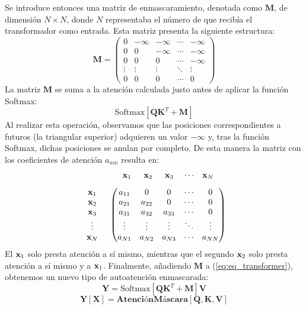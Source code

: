 Se introduce entonces una matriz de enmascaramiento, denotada como $\mathbf{M}$, 
de dimensión $N \times N$, donde $ N$ representaba el número de \tokens{} que 
recibía el transformador como entrada. Esta matriz presenta la siguiente 
estructura:
\begin{equation*}
    \mathbf{M} = \begin{pmatrix} 
0 & -\infty & -\infty & \cdots & -\infty \\ 
0 & 0 & -\infty & \cdots & -\infty \\ 
0 & 0 & 0 & \cdots & -\infty \\
\vdots & \vdots & \vdots & \ddots & \vdots \\ 
0 & 0 & 0 & \cdots & 0 
\end{pmatrix}
\end{equation*}
La matriz $\mathbf{M}$ se suma a la atención calculada justo antes de aplicar la función Softmax:
$$\text{Softmax}\left[ \mathbf{Q} \mathbf{K}^T + \mathbf{M} \right]$$
Al realizar esta operación, observamos que las posiciones correspondientes a \tokens{} futuros (la triangular superior) adquieren un valor $-\infty$ y, tras la función Softmax, dichas posiciones se anulan por completo. De esta manera la matriz con los coeficientes de atención $a_{nm}$ resulta en:
\[
\begin{array}{cc}
 & \begin{array}{ccccc} \mathbf{x}_1 & \hspace{0.5em} \mathbf{x}_2 & \hspace{0.5em} \mathbf{x}_3 & \hspace{0.3em} \cdots & \mathbf{x}_N \end{array} \\[2ex]
\begin{array}{c} \mathbf{x}_1 \\ \mathbf{x}_2 \\ \mathbf{x}_3 \\ \vdots \\ \mathbf{x}_N \end{array} &
\begin{pmatrix}
a_{11} & 0      & 0      & \cdots & 0 \\
a_{21} & a_{22} & 0      & \cdots & 0 \\
a_{31} & a_{32} & a_{33} & \cdots & 0 \\
\vdots & \vdots & \vdots & \ddots & \vdots \\
a_{N1} & a_{N2} & a_{N3} & \cdots & a_{NN}
\end{pmatrix}
\end{array}
\]
El \token{} $\mathbf{x}_1$ solo presta atención a sí mismo, mientras que el segundo 
\token{} $\mathbf{x}_2$ solo presta atención a sí mismo y a $\mathbf{x}_1$. 
Finalmente, añadiendo $\mathbf{M}$ a (\ref{eq:eq_transformer}), 
obtenemos un nuevo tipo de autoatención enmascarada:
\begin{equation}
    \mathbf{Y} = \text{Softmax}[\mathbf{Q}  \mathbf{K}^T + \mathbf{M}]\mathbf{V}
    \label{eq:eq_transformer_mascara}
\end{equation}
\begin{equation}
    \mathbf{Y}[\mathbf{X}] = \textbf{AtenciónMáscara}[\mathbf{Q}, \mathbf{K}, \mathbf{V}]
    \label{atencion_mascara}
\end{equation}

